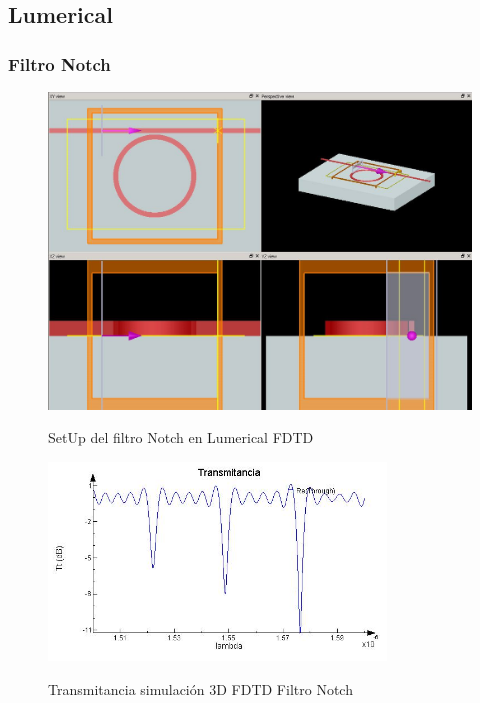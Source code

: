 \subsection{Lumerical}
\label{ss:lumerical}

\subsubsection{Filtro Notch}

\begin{figure}[H]
\caption{SetUp del filtro Notch en Lumerical FDTD}
\centering
\includegraphics[width=1.0\textwidth,natwidth=1066,natheight=799]{figs/lum_setup_n.jpg}
\label{fig:lum_setup_n}
\end{figure} 

\begin{figure}[H]
\caption{Transmitancia simulación 3D FDTD Filtro Notch}
\centering
\includegraphics[width=0.8\textwidth,natwidth=605,natheight=356]{figs/lum_t_n.jpg}
\label{fig:lum_t_fdtd_n}
\end{figure} 

